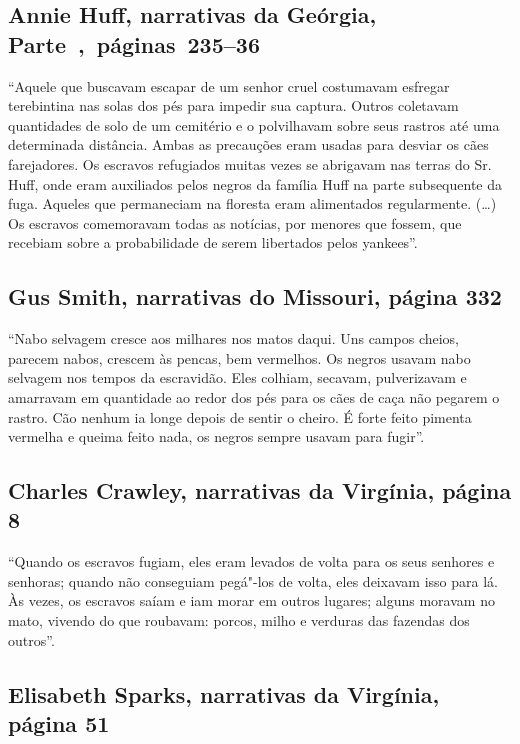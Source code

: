 \subsection{Annie Huff, narrativas da Geórgia, Parte~,~páginas~235--36}
\label{ref150}

``Aquele que buscavam escapar de um senhor cruel costumavam esfregar
terebintina nas solas dos pés para impedir sua captura. Outros coletavam
quantidades de solo de um cemitério e o polvilhavam sobre seus rastros
até uma determinada distância. Ambas as precauções eram usadas para
desviar os cães farejadores. Os escravos refugiados muitas vezes se
abrigavam nas terras do Sr. Huff, onde eram auxiliados pelos negros da
família Huff na parte subsequente da fuga. Aqueles que permaneciam na
floresta eram alimentados regularmente. (\ldots{}) Os escravos
comemoravam todas as notícias, por menores que fossem, que recebiam
sobre a probabilidade de serem libertados pelos yankees''.

\subsection{Gus Smith, narrativas do Missouri, página 332}
\label{ref243}

``Nabo selvagem cresce aos milhares nos matos daqui. Uns campos cheios,
parecem nabos, crescem às pencas, bem vermelhos. Os negros usavam nabo
selvagem nos tempos da escravidão. Eles colhiam, secavam, pulverizavam e
amarravam em quantidade ao redor dos pés para os cães de caça não
pegarem o rastro. Cão nenhum ia longe depois de sentir o cheiro. É forte
feito pimenta vermelha e queima feito nada, os negros sempre usavam para
fugir''.

\subsection{Charles Crawley, narrativas da Virgínia, página 8} \label{ref62}

``Quando os escravos fugiam, eles eram levados de volta para os seus
senhores e senhoras; quando não conseguiam pegá"-los de volta, eles
deixavam isso para lá. Às vezes, os escravos saíam e iam morar em outros
lugares; alguns moravam no mato, vivendo do que roubavam: porcos, milho
e verduras das fazendas dos outros''.

\subsection{Elisabeth Sparks, narrativas da Virgínia, página 51}
\label{ref251} 

